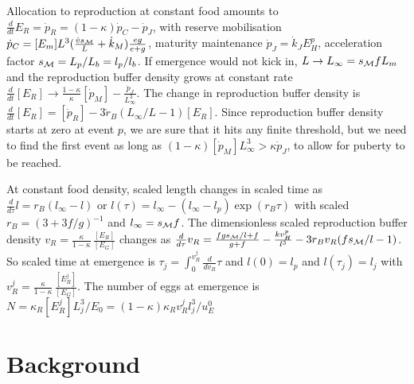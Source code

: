 \documentclass{article}
\begin{document}
Allocation to reproduction at constant food amounts to $\frac{d} {dt} E_R = \dot{p}_R =  (1 - \kappa) \dot{p}_C  - \dot{p}_J $, with reserve mobilisation $\dot{p}_C = [E_m] L^3 (\frac{\dot{v} s_{\cal M}} {L} + \dot{k}_M) \frac{e g} {e + g}$, maturity maintenance $\dot{p}_J = \dot{k}_J E_H^p$, acceleration factor $s_{\cal M} = L_p/ L_b = l_p/ l_b$.
If emergence would not kick in, $L \rightarrow L_\infty = s_{\cal M} f L_m$ and the reproduction buffer density grows at constant rate $\frac{d} {dt} [E_R] \rightarrow \frac{1 - \kappa} {\kappa} [\dot{p}_M] - \frac{\dot{p}_J} {L_\infty^3}$. 
The change in reproduction buffer density is $\frac{d} {dt} [E_R] = [\dot{p}_R] - 3 \dot{r}_B (L_\infty/ L - 1) [E_R]$.
Since reproduction buffer density starts at zero at event $p$, we are sure that it hits any finite threshold, but we need to find the first event as long as $(1 - \kappa) [\dot{p}_M] L_\infty^3 > \kappa \dot{p}_J$, to allow for puberty to be reached.

At constant food density, scaled length changes in scaled time as $\frac{d} {d \tau} l = r_B(l_\infty - l)$ or $l(\tau) = l_\infty - (l_\infty - l_p) \exp(r_B \tau)$ with scaled $r_B = (3 + 3 f/g)^{-1}$ and $l_\infty = s_{\cal M} f$.
The dimensionless scaled reproduction buffer density $v_R = \frac{\kappa} {1 - \kappa} \, \frac{[E_R]} {[E_G]}$ changes as 
$\frac{d} {d \tau} v_R = \frac{f g s_{\cal M}/ l + f} {g + f} - \frac{k v_H^p} {l^3} - 3 r_B v_R (f s_{\cal M} / l - 1)$.
So scaled time at emergence is $\tau_j = \int_0^{v_R^j} \frac{d} {d v_R} \tau$ and $l(0) = l_p$ and $l(\tau_j) = l_j$ with  $v_R^j = \frac{\kappa} {1 - \kappa} \, \frac{[E_R^j]} {[E_G]}$. 
The number of eggs at emergence is $N = \kappa_R [E_R^j] L_j^3/ E_0 = (1 - \kappa) \kappa_R v_R^j l_j^3/ u_E^0$




\section{Background}







\end{document}

